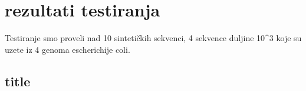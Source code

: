 \chapter{rezultati testiranja}

Testiranje smo proveli nad 10 sintetičkih sekvenci, 4 sekvence duljine 10^3 koje su uzete iz 4 genoma escherichije coli.

\section{title}